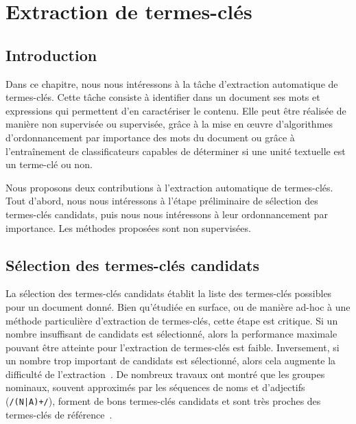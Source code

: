 \chapter{Extraction de termes-clés}
\label{chap:main-domain_independent_keyphrase_extraction}


  \section{Introduction}
  \label{sec:main:domain_independent_keyphrase_extraction-introduction}
    Dans ce chapitre, nous nous intéressons à la tâche d'extraction automatique
    de termes-clés. Cette tâche consiste à identifier dans un document ses mots
    et expressions qui permettent d'en caractériser le contenu. Elle peut être
    réalisée de manière non supervisée ou supervisée, grâce à la mise en
    \oe{}uvre d'algorithmes d'ordonnancement par importance des mots du document
    ou grâce à l'entraînement de classificateurs capables de déterminer si une
    unité textuelle est un terme-clé ou non.

    Nous proposons deux contributions à l'extraction automatique de termes-clés.
    Tout d'abord, nous nous intéressons à l'étape préliminaire de sélection des
    termes-clés candidats, puis nous nous intéressons à leur ordonnancement par
    importance. Les méthodes proposées sont non supervisées.


  \section{Sélection des termes-clés candidats}
  \label{sec:main:domain_independent_keyphrase_extraction-keyphrase_candidate_selection}
    La sélection des termes-clés candidats établit la liste des termes-clés
    possibles pour un document donné. Bien qu'étudiée en surface, ou de manière
    ad-hoc à une méthode particulière d'extraction de termes-clés, cette étape
    est critique. Si un nombre insuffisant de candidats est sélectionné, alors
    la performance maximale pouvant être atteinte pour l'extraction de
    termes-clés est faible. Inversement, si un nombre trop important de
    candidats est sélectionné, alors cela augmente la difficulté de l'extraction~\cite{hasan2014state_of_the_art}.
    De nombreux travaux ont montré que les groupes nominaux, souvent
    approximés par les séquences de noms et d'adjectifs (\texttt{/(N|A)+/}),
    forment de bons termes-clés candidats et sont très proches des termes-clés
    de
    référence~\cite{barker2000nounphrasehead,hulth2003keywordextraction,wan2008expandrank}.

